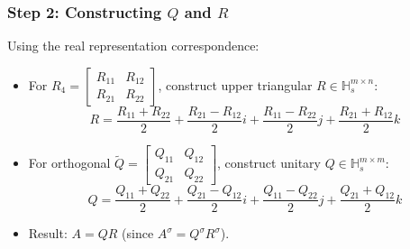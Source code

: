 \documentclass{beamer}
\begin{document}
\begin{frame}
    \frametitle{Step 2: Constructing \( Q \) and \( R \)}
    Using the real representation correspondence:
    \begin{itemize}
        \item For \( R_4 = \begin{bmatrix} R_{11} & R_{12} \\ R_{21} & R_{22} \end{bmatrix} \), construct upper triangular \( R \in \mathbb{H}_s^{m \times n} \):
        \[
        R = \frac{R_{11}+R_{22}}{2} + \frac{R_{21}-R_{12}}{2}i + \frac{R_{11}-R_{22}}{2}j + \frac{R_{21}+R_{12}}{2}k
        \]
        \item For orthogonal \( \widetilde{Q} = \begin{bmatrix} Q_{11} & Q_{12} \\ Q_{21} & Q_{22} \end{bmatrix} \), construct unitary \( Q \in \mathbb{H}_s^{m \times m} \):
        \[
        Q = \frac{Q_{11}+Q_{22}}{2} + \frac{Q_{21}-Q_{12}}{2}i + \frac{Q_{11}-Q_{22}}{2}j + \frac{Q_{21}+Q_{12}}{2}k
        \]
        \item Result: \( A = QR \) (since \( A^\sigma = Q^\sigma R^\sigma \)).
    \end{itemize}
\end{frame}

\end{document}
